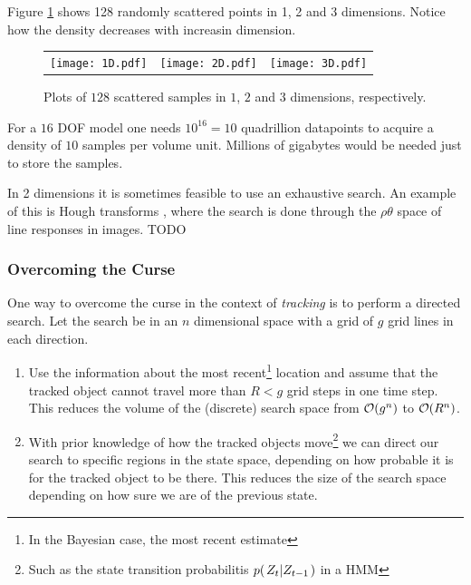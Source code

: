 \begin{example}
  Figure \ref{fig:curse-of-dimensionality} shows 128 randomly scattered points in 1, 2 and 3 dimensions. Notice how the density decreases with increasin dimension.
  \begin{figure}
    \begin{tabular}{rcl}
      \texttt{[image: 1D.pdf]}&
      \texttt{[image: 2D.pdf]}&
      \texttt{[image: 3D.pdf]}
    \end{tabular}
    \caption{Plots of $128$ scattered samples in $1$, $2$ and $3$ dimensions, respectively.}
    \label{fig:curse-of-dimensionality}
  \end{figure}
\end{example}

\begin{example}
  For a $16$ DOF model one needs $10^{16}=10$ quadrillion datapoints to acquire a density of $10$ samples per volume unit. Millions of gigabytes would be needed just to store the samples.
\end{example}

\begin{example}
  In 2 dimensions it is sometimes feasible to use an exhaustive search. An example of this is Hough transforms \cite{DigitalImageProcessing}, where the search is done through the $\rho\theta$ space of line responses in images. TODO
\end{example}

\subsubsection{Overcoming the Curse}
One way to overcome the curse in the context of \emph{tracking} is to perform a directed search. Let the search be in an $n$ dimensional space with a grid of $g$ grid lines in each direction.

\begin{enumerate}
\item Use the information about the most recent\footnote{In the Bayesian case, the most recent estimate} location and assume that the tracked object cannot travel more than $R < g$ grid steps in one time step. This reduces the volume of the (discrete) search space from $\mathcal{O}{\left(g^n\right)}$ to $\mathcal{O}{\left(R^n\right)}$.
\item With prior knowledge of how the tracked objects move\footnote{Such as the state transition probabilitis $p{(\left. Z_t \middle\vert Z_{t-1} \right.)}$ in a HMM} we can direct our search to specific regions in the state space, depending on how probable it is for the tracked object to be there. This reduces the size of the search space depending on how sure we are of the previous state.
\end{enumerate} 

